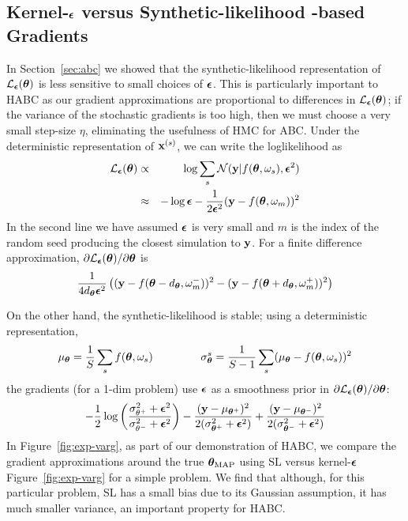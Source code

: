 \documentclass[]{article}
\begin{document}
\subsection{Kernel-${\bm {\epsilon}}$ versus Synthetic-likelihood -based Gradients}\label{sec:habc-grads}
In Section~\ref{sec:abc} we showed that the synthetic-likelihood representation of $\mathcal{L}_{{\bm {\epsilon}}}({\bm \theta})$ is less sensitive to small choices of ${\bm {\epsilon}}$.  This is particularly important to HABC as our gradient approximations are proportional to differences in $\mathcal{L}_{{\bm {\epsilon}}}({\bm \theta})$; if the variance of the stochastic gradients is too high, then we must choose a very small step-size $\eta$, eliminating the usefulness of HMC for ABC.  Under the deterministic representation of ${\bf x}^{(s)}$, we can write the loglikelihood as
\begin{eqnarray}
 \mathcal{L}_{{\bm {\epsilon}}}({\bm \theta}) & \propto & \log \sum_s \mathcal{N}( {\bf y} | f( {\bm \theta}, \omega_s), {\bm {\epsilon}}^2 )\\
                 & \approx & -\log {\bm {\epsilon}} -\frac{1}{2 {\bm {\epsilon}}^2} ( {\bf y} - f( {\bm \theta}, \omega_m) )^2 
\end{eqnarray}
In the second line we have assumed ${\bm {\epsilon}}$ is very small and $m$ is the index of the random seed producing the closest simulation to ${\bf y}$.  For a finite difference approximation, $\partial \mathcal{L}_{{\bm {\epsilon}}}({\bm \theta})/\partial{\bm \theta}$ is
\begin{equation}
 \frac{1}{4d_{{\bm \theta}} {\bm {\epsilon}}^2} \left( ( {\bf y} - f( {\bm \theta}-d_{{\bm \theta}}, \omega_m^-) )^2 -( {\bf y} - f( {\bm \theta} + d_{{\bm \theta}}, \omega_m^+) )^2 \right)
\end{equation}

On the other hand, the synthetic-likelihood is stable; using a deterministic representation, 
\begin{equation}
\mu_{{\bm \theta}} = \frac{1}{S} \sum_s f( {\bm \theta}, \omega_s ) ~~~~~~~~~~~~~ \sigma^s_{{\bm \theta}} = \frac{1}{S-1} \sum_s ( \mu_{{\bm \theta}} - f( {\bm \theta}, \omega_s ) )^2
\end{equation}
the gradients (for a 1-dim problem) use ${\bm {\epsilon}}$ as a smoothness prior in $\partial \mathcal{L}_{{\bm {\epsilon}}}({\bm \theta})/\partial{\bm \theta}$:
\begin{equation}
  -\frac{1}{2}\log\left(\frac{\sigma_{\theta^+}^2 + {\bm {\epsilon}}^2}{\sigma_{\theta^-}^2 + {\bm {\epsilon}}^2}\right) -\frac{( {\bf y} - \mu_{{\bm \theta}^+} )^2 }{2 (\sigma^2_{{\bm \theta}^+} + {\bm {\epsilon}}^2 )} +\frac{( {\bf y} - \mu_{{\bm \theta}^-} )^2 }{2 (\sigma^2_{{\bm \theta}^-} + {\bm {\epsilon}}^2 )} 
\end{equation} 
In Figure~\ref{fig:exp-varg}, as part of our demonstration of HABC, we compare the gradient approximations around the true ${\bm \theta}_{\text{MAP}}$ using SL versus kernel-${\bm {\epsilon}}$ Figure~\ref{fig:exp-varg} for a simple problem.  We find that although, for this particular problem, SL has a small bias due to its Gaussian assumption, it has much smaller variance, an important property for HABC.
\end{document}
